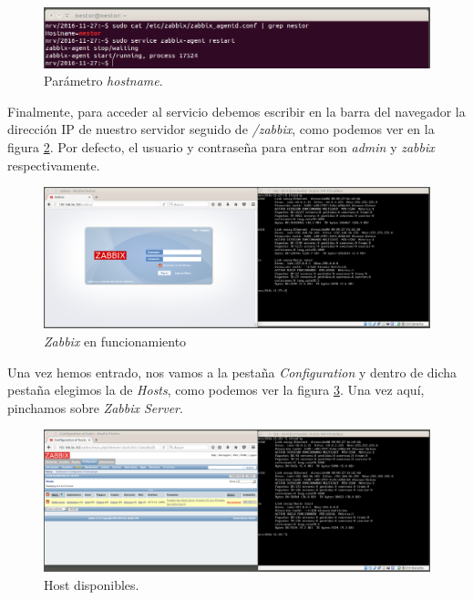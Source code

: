 \documentclass[a4paper,titlepage,12pt]{report}	%
\numberwithin{figure}{section} %
\numberwithin{table}{section} %
\begin{document}
	\begin{figure}[H]
	   \includegraphics[width=\linewidth]{./Imagenes/P3/O4-13.png}
	   \vspace{-0.5cm}
	   \caption[Parámetro \textit{hostname}.]{Parámetro \textit{hostname}.}
	   \label{P3-O4-13}
	\end{figure}

	Finalmente, para acceder al servicio debemos escribir en la barra del navegador la dirección IP de nuestro servidor seguido de \textit{/zabbix}, como podemos ver en la figura \ref{P3-O4-14}. Por defecto, el usuario y contraseña para entrar son \textit{admin} y \textit{zabbix} respectivamente.

	\begin{figure}[H]
	   \includegraphics[width=\linewidth]{./Imagenes/P3/O4-14.png}
	   \vspace{-0.5cm}
	   \caption[\textit{Zabbix} en funcionamiento.]{\textit{Zabbix} en funcionamiento}
	   \label{P3-O4-14}
	\end{figure}

	Una vez hemos entrado, nos vamos a la pestaña \textit{Configuration} y dentro de dicha pestaña elegimos la de \textit{Hosts}, como podemos ver la figura \ref{P3-O4-15}. Una vez aquí, pinchamos sobre \textit{Zabbix Server}.

	\begin{figure}[H]
	   \includegraphics[width=\linewidth]{./Imagenes/P3/O4-15.png}
	   \vspace{-0.5cm}
	   \caption[Host disponibles.]{Host disponibles.}
	   \label{P3-O4-15}
	\end{figure}
\end{document}
